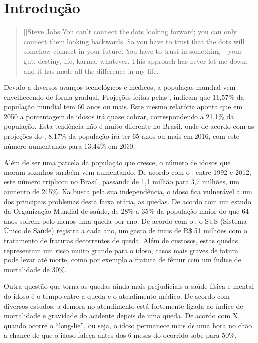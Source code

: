 \chapter{Introdução}
\label{cap:introducao}

\begin{quotation}[]{Steve Jobs}
You can’t connect the dots looking forward; you can only connect them looking backwards. So you have to trust that the dots will somehow connect in your future. You have to trust in something – your gut, destiny, life, karma, whatever. This approach has never let me down, and it has made all the difference in my life.
\end{quotation}

Devido a diversos avanços tecnológicos e médicos, a população mundial vem envelhecendo de forma gradual. Projeções feitas pelas \cite{unPopulation:13}, indicam que 11,57\% da população mundial tem 60 anos ou mais. Este mesmo relatório aponta que em 2050 a porcentagem de idosos irá quase dobrar, correspondendo a 21,1\% da população. Esta tendência não é muito diferente no Brasil, onde de acordo com as projeções do \cite{ibgePopulation:16}, 8,17\% da população irá ter 65 anos ou mais em 2016, com este número aumentando para 13,44\% em 2030.

Além de ser uma parcela da população que cresce, o número de idosos que moram sozinhos também vem aumentando. De acordo com o \cite{PNAD:12}, entre 1992 e 2012,  este número triplicou no Brasil, passando de 1,1 milhão para 3,7 milhões, um aumento de 215\%. Na busca pela sua independência, o idoso fica vulnerável a um dos principais problemas desta faixa etária, as quedas. De acordo com um estudo da Organização Mundial de saúde,  de 28\% a 35\% da população maior do que 64 anos sofrem pelo menos uma queda por ano. De acordo com o \cite{portalBrasilQuedas:12}, o SUS (Sistema Único de Saúde) registra a cada ano, um gasto de mais de R\$ 51 milhões com o tratamento de fraturas decorrentes de queda. Além de custosos, estas quedas representam um risco muito grande para o idoso, casos mais graves de fatura pode levar até morte, como por exemplo a fratura de fêmur com um índice de mortalidade de 30\%.

Outra questão que torna as quedas ainda mais prejudiciais a saúde física e mental do idoso é o tempo entre a queda e o  atendimento médico. De acordo com diversos estudos, a demora no atendimento está fortemente ligada ao índice de mortalidade e gravidade do acidente depois de uma queda. De acordo com X, quando ocorre o “long-lie”, ou seja, o idoso permanece mais de uma hora no chão a chance de que o idoso faleça antes dos 6 meses do ocorrido sobe para 50\%.

